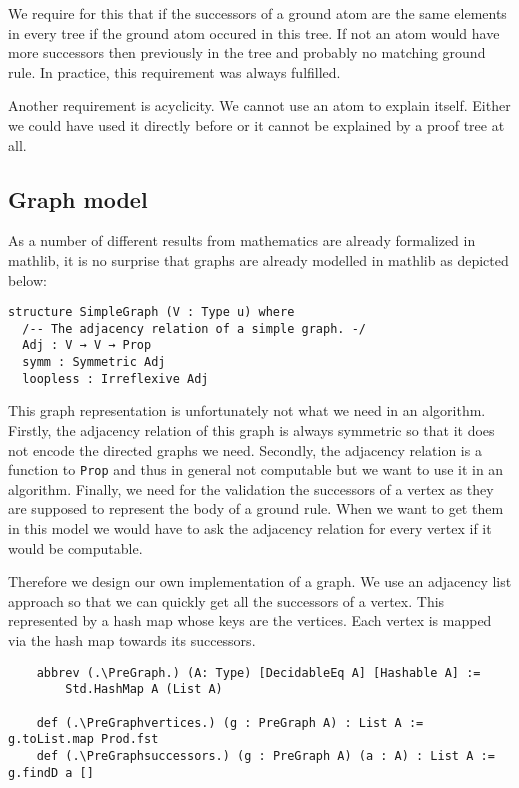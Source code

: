 We require for this that if the successors of a ground atom are the same elements  in every tree if the ground atom occured in this tree. If not an atom would have more successors then previously in the tree and probably no matching ground rule. In practice, this requirement was always fulfilled.

Another requirement is acyclicity. We cannot use an atom to explain itself. Either we could have used it directly before or it cannot be explained by a proof tree at all. 
\subsection{Graph model}

As a number of different results from mathematics are already formalized in mathlib, it is no surprise that graphs are already modelled in mathlib as depicted below:

\begin{lstlisting}
structure SimpleGraph (V : Type u) where
  /-- The adjacency relation of a simple graph. -/
  Adj : V → V → Prop
  symm : Symmetric Adj 
  loopless : Irreflexive Adj
\end{lstlisting}

This graph representation is unfortunately not what we need in an algorithm. Firstly, the adjacency relation of this graph is always symmetric so that it does not encode the directed graphs we need. Secondly, the adjacency relation is a function to \lstinline|Prop| and thus in general not computable but we want to use it in an algorithm. Finally, we need for the validation the successors of a vertex as they are supposed to represent the body of a ground rule. When we want to get them in this model we would have to ask the adjacency relation for every vertex if it would be computable.

Therefore we design our own implementation of a graph. We use an adjacency list approach so that we can quickly get all the successors of a vertex. This represented by a hash map whose keys are the vertices. Each vertex is mapped via the hash map towards its successors.

\begin{lstlisting}
    abbrev (.\PreGraph.) (A: Type) [DecidableEq A] [Hashable A] := 
        Std.HashMap A (List A)

    def (.\PreGraphvertices.) (g : PreGraph A) : List A := g.toList.map Prod.fst
    def (.\PreGraphsuccessors.) (g : PreGraph A) (a : A) : List A := g.findD a []
\end{lstlisting}

